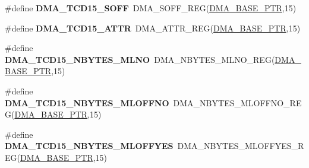 \begin{DoxyCompactItemize}
\item 
\hypertarget{group___d_m_a___register___accessor___macros_gaa9109e0dee0d1aa8b467ef00c70f2971}{}\#define {\bfseries D\+M\+A\+\_\+\+T\+C\+D15\+\_\+\+S\+O\+F\+F}~D\+M\+A\+\_\+\+S\+O\+F\+F\+\_\+\+R\+E\+G(\hyperlink{group___d_m_a___peripheral_ga6997fbc1b1973e9f27170217a3bd6f22}{D\+M\+A\+\_\+\+B\+A\+S\+E\+\_\+\+P\+T\+R},15)\label{group___d_m_a___register___accessor___macros_gaa9109e0dee0d1aa8b467ef00c70f2971}

\item 
\hypertarget{group___d_m_a___register___accessor___macros_ga51d5b5ee407c0a940461edc68f69bea3}{}\#define {\bfseries D\+M\+A\+\_\+\+T\+C\+D15\+\_\+\+A\+T\+T\+R}~D\+M\+A\+\_\+\+A\+T\+T\+R\+\_\+\+R\+E\+G(\hyperlink{group___d_m_a___peripheral_ga6997fbc1b1973e9f27170217a3bd6f22}{D\+M\+A\+\_\+\+B\+A\+S\+E\+\_\+\+P\+T\+R},15)\label{group___d_m_a___register___accessor___macros_ga51d5b5ee407c0a940461edc68f69bea3}

\item 
\hypertarget{group___d_m_a___register___accessor___macros_ga88b7235ecd3b35d9a897ff174187fc8a}{}\#define {\bfseries D\+M\+A\+\_\+\+T\+C\+D15\+\_\+\+N\+B\+Y\+T\+E\+S\+\_\+\+M\+L\+N\+O}~D\+M\+A\+\_\+\+N\+B\+Y\+T\+E\+S\+\_\+\+M\+L\+N\+O\+\_\+\+R\+E\+G(\hyperlink{group___d_m_a___peripheral_ga6997fbc1b1973e9f27170217a3bd6f22}{D\+M\+A\+\_\+\+B\+A\+S\+E\+\_\+\+P\+T\+R},15)\label{group___d_m_a___register___accessor___macros_ga88b7235ecd3b35d9a897ff174187fc8a}

\item 
\hypertarget{group___d_m_a___register___accessor___macros_ga60e6538f7c7033e20c33a8a09b5748fe}{}\#define {\bfseries D\+M\+A\+\_\+\+T\+C\+D15\+\_\+\+N\+B\+Y\+T\+E\+S\+\_\+\+M\+L\+O\+F\+F\+N\+O}~D\+M\+A\+\_\+\+N\+B\+Y\+T\+E\+S\+\_\+\+M\+L\+O\+F\+F\+N\+O\+\_\+\+R\+E\+G(\hyperlink{group___d_m_a___peripheral_ga6997fbc1b1973e9f27170217a3bd6f22}{D\+M\+A\+\_\+\+B\+A\+S\+E\+\_\+\+P\+T\+R},15)\label{group___d_m_a___register___accessor___macros_ga60e6538f7c7033e20c33a8a09b5748fe}

\item 
\hypertarget{group___d_m_a___register___accessor___macros_ga95fb2cb3eb8f170bf832c7b018a96ec5}{}\#define {\bfseries D\+M\+A\+\_\+\+T\+C\+D15\+\_\+\+N\+B\+Y\+T\+E\+S\+\_\+\+M\+L\+O\+F\+F\+Y\+E\+S}~D\+M\+A\+\_\+\+N\+B\+Y\+T\+E\+S\+\_\+\+M\+L\+O\+F\+F\+Y\+E\+S\+\_\+\+R\+E\+G(\hyperlink{group___d_m_a___peripheral_ga6997fbc1b1973e9f27170217a3bd6f22}{D\+M\+A\+\_\+\+B\+A\+S\+E\+\_\+\+P\+T\+R},15)\label{group___d_m_a___register___accessor___macros_ga95fb2cb3eb8f170bf832c7b018a96ec5}


\end{DoxyCompactItemize}
